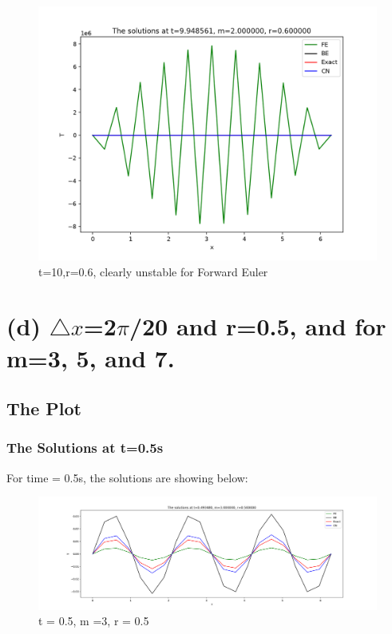 \documentclass[12pt]{article}
\begin{document}
\begin{figure}[H] 
\centering 
\includegraphics[scale=0.25]{Unstable FE.jpg} 
\caption{t=10,r=0.6, clearly unstable for Forward Euler} 
\label{TDMA Solver code} 
\end{figure}














\section{(d) $\triangle x$=2$\pi$/20 and r=0.5, and for m=3, 5, and 7.}
\subsection{The Plot}

\subsubsection{The Solutions at  t=0.5s}
For time = 0.5s, the solutions are showing below:

\begin{figure}[H] 
\centering 
\includegraphics[scale=0.15]{0.5,0.3,0.5.jpg} 
\caption{t = 0.5, m =3, r = 0.5} 
\label{TDMA Solver code} 
\end{figure}
\end{document}
